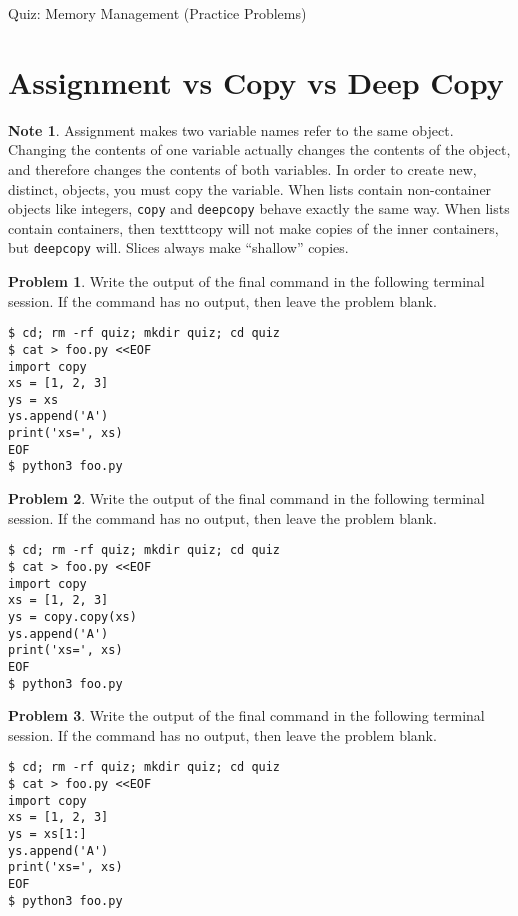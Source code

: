 \documentclass[10pt]{article}
\theoremstyle{definition}
\newtheorem{problem}{Problem}
\newtheorem{note}{Note}
\begin{document}
\begin{center}
    {
\Large
    Quiz: Memory Management (Practice Problems)
}

    \vspace{0.1in}
\end{center}

\section{Assignment vs Copy vs Deep Copy}

\begin{note}
Assignment makes two variable names refer to the same object.
Changing the contents of one variable actually changes the contents of the object,
and therefore changes the contents of both variables.
In order to create new, distinct, objects, you must copy the variable.
When lists contain non-container objects like integers, \texttt{copy} and \texttt{deepcopy} behave exactly the same way.
    When lists contain containers, then texttt{copy} will not make copies of the inner containers, but \texttt{deepcopy} will.
    Slices always make ``shallow'' copies.
\end{note}


\filbreak
\begin{problem}
    Write the output of the final command in the following terminal session.
    If the command has no output, then leave the problem blank.
\end{problem}
\begin{lstlisting}
$ cd; rm -rf quiz; mkdir quiz; cd quiz
$ cat > foo.py <<EOF
import copy
xs = [1, 2, 3]
ys = xs
ys.append('A')
print('xs=', xs)
EOF
$ python3 foo.py
\end{lstlisting}

\filbreak
\begin{problem}
    Write the output of the final command in the following terminal session.
    If the command has no output, then leave the problem blank.
\end{problem}
\begin{lstlisting}
$ cd; rm -rf quiz; mkdir quiz; cd quiz
$ cat > foo.py <<EOF
import copy
xs = [1, 2, 3]
ys = copy.copy(xs)
ys.append('A')
print('xs=', xs)
EOF
$ python3 foo.py
\end{lstlisting}

\filbreak
\begin{problem}
    Write the output of the final command in the following terminal session.
    If the command has no output, then leave the problem blank.
\end{problem}
\begin{lstlisting}
$ cd; rm -rf quiz; mkdir quiz; cd quiz
$ cat > foo.py <<EOF
import copy
xs = [1, 2, 3]
ys = xs[1:]
ys.append('A')
print('xs=', xs)
EOF
$ python3 foo.py
\end{lstlisting}
\end{document}
